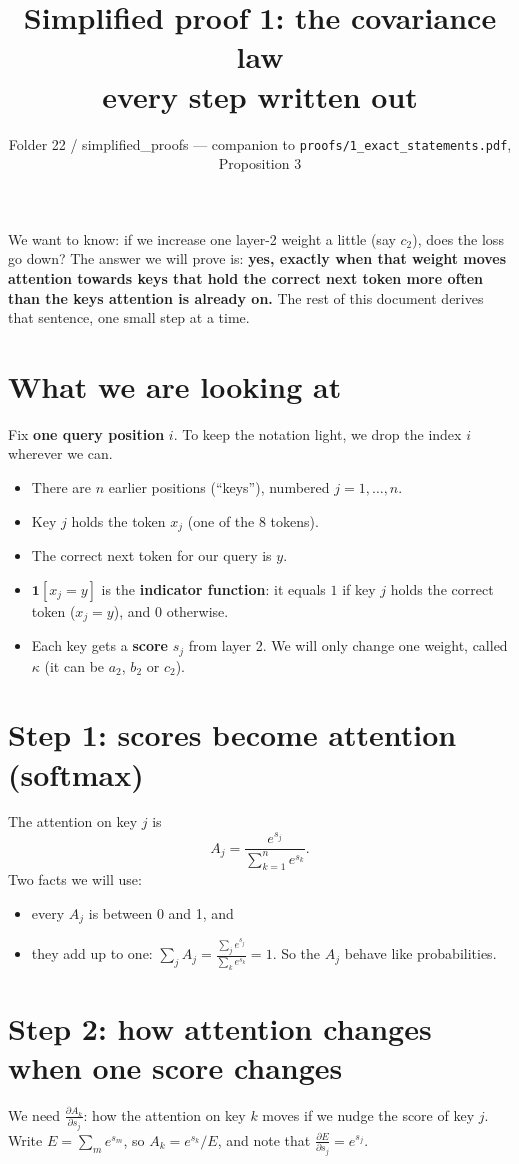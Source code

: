 \documentclass[11pt]{article}
\title{Simplified proof 1: the covariance law\\[4pt]
\large every step written out}
\author{Folder 22 / simplified\_proofs --- companion to \texttt{proofs/1\_exact\_statements.pdf}, Proposition 3}
\date{}
\newcommand{\1}{\mathbf{1}}
\begin{document}
\maketitle

\begin{idea}
We want to know: if we increase one layer-2 weight a little (say $c_2$), does the loss go down?
The answer we will prove is: \textbf{yes, exactly when that weight moves attention towards keys that
hold the correct next token more often than the keys attention is already on.} The rest of this
document derives that sentence, one small step at a time.
\end{idea}

\section{What we are looking at}
Fix \textbf{one query position} $i$. To keep the notation light, we drop the index $i$ wherever we can.
\begin{itemize}
\item There are $n$ earlier positions (``keys''), numbered $j=1,\dots,n$.
\item Key $j$ holds the token $x_j$ (one of the 8 tokens).
\item The correct next token for our query is $y$.
\item $\1[x_j=y]$ is the \textbf{indicator function}: it equals $1$ if key $j$ holds the correct token ($x_j=y$), and $0$ otherwise.
\item Each key gets a \textbf{score} $s_j$ from layer 2. We will only change one weight, called $\kappa$
(it can be $a_2$, $b_2$ or $c_2$).
\end{itemize}

\section{Step 1: scores become attention (softmax)}
The attention on key $j$ is
\[
A_j=\frac{e^{s_j}}{\sum_{k=1}^n e^{s_k}} .
\]
Two facts we will use:
\begin{itemize}
\item every $A_j$ is between 0 and 1, and
\item they add up to one: $\sum_j A_j=\frac{\sum_je^{s_j}}{\sum_ke^{s_k}}=1$. So the $A_j$ behave like probabilities.
\end{itemize}

\section{Step 2: how attention changes when one score changes}
We need $\frac{\partial A_k}{\partial s_j}$: how the attention on key $k$ moves if we nudge the score of key
$j$. Write $E=\sum_m e^{s_m}$, so $A_k=e^{s_k}/E$, and note that $\frac{\partial E}{\partial s_j}=e^{s_j}$.
\end{document}
